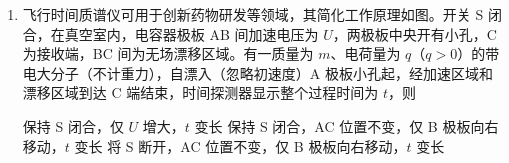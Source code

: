 \documentclass[\gkver]{gaokaozhenti}
\begin{document}
\begin{enumerate}
{C．导体棒下降过程中，感应电动势为 $\overline{E}=\frac{\Delta\Phi}{\Delta t}=\frac{BLh}{\Delta t}$，

感应电流为 $\overline{I}=\frac{\overline{E}}{R}=\frac{BLh}{R\cdot\Delta t}$，

通过导体棒的电荷量大小为 $q=\overline{I}\cdot\Delta t=\frac{BLh}{R}$，故 C 正确；

D．根据题意可知，导体棒下降过程中，先做加速度减小的加速运动，再做加速度增大的减速运动，则导体棒的加速度最大值出现在最低点或初始位置，导体棒速度最大时有 $mg=\frac{B^{2}L^{2}v}{R}+kx'$，

若没有磁场，由能量守恒定律有 $mgx=\frac{1}{2}kx^{2}$，

可知，在最低点时，有 $kx=2mg$，

此时，加速度为 $a=\frac{kx-mg}{m}=g$，

有磁场时，由能量守恒定律可知，弹簧的形变量减小，则最低点时加速度小于 $g$，则导体棒的加速度最大值出现在初始位置，此时，导体棒只受重力，加速度为 $g>\frac{B^{2}L^{2}v}{Rm}$，故 D 错误。

故选 C。
}

\item
飞行时间质谱仪可用于创新药物研发等领域，其简化工作原理如图。开关 S 闭合，在真空室内，电容器极板 AB 间加速电压为 $U$，两极板中央开有小孔，C 为接收端，BC 间为无场漂移区域。有一质量为 $m$、电荷量为 $q$（$q>0$）的带电大分子（不计重力），自漂入（忽略初速度）A 极板小孔起，经加速区域和漂移区域到达 C 端结束，时间探测器显示整个过程时间为 $t$，则 

\onepicture[h=4.0cm]{}

{保持 S 闭合，仅 $U$ 增大，$t$ 变长}
{保持 S 闭合，AC 位置不变，仅 B 极板向右移动，$t$ 变长}
{将 S 断开，AC 位置不变，仅 B 极板向右移动，$t$ 变长}

\end{enumerate}
\end{document}
